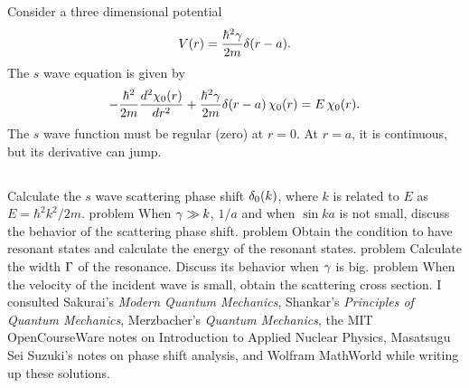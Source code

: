 \documentclass[11pt]{article}
\newcommand{\beq}{\begin{equation*}}
\newcommand{\eeq}{\end{equation*}}
\newenvironment{statement}[1]
{
	\section{#1}
	\color{darkgray}
	\ignorespaces
}
{
}
\newenvironment{problem}
{
	\color{darkgray}
	\subsection{}
	\ignorespaces
}
\newcommand{\Schrodinger}{Schr\"{o}dinger}
\begin{document}
\begin{statement}{}
	Consider a three dimensional potential
	\beq
		V(r) = \frac{\hbar^2 \gam}{2m} \del(r - a).
	\eeq
	The $s$ wave {\Schrodinger} equation is given by
	\beq
		-\frac{\hbar^2}{2m} \dv[2]{\chior}{r} + \frac{\hbar^2 \gam}{2m} \del(r - a) \, \chior = E \,\chior.
	\eeq
	The $s$ wave function must be regular (zero) at $r = 0$.  At $r = a$, it is continuous, but its derivative can jump.
\end{statement}

\begin{problem}
	Calculate the $s$ wave scattering phase shift $\delta_0(k)$, where $k$ is related to $E$ as $E = \hbar^2 k^2 / 2m$.
\end{problem}

\begin{problem}
	When $\gamma \gg k$, $1/a$ and when $\sin ka$ is not small, discuss the behavior of the scattering phase shift.
\end{problem}

\begin{problem}
	Obtain the condition to have resonant states and calculate the energy of the resonant states.
\end{problem}

\begin{problem}
	Calculate the width $\Gamma$ of the resonance.  Discuss its behavior when $\gamma$ is big.
\end{problem}

\begin{problem}
	When the velocity of the incident wave is small, obtain the scattering cross section.
\end{problem}



\vfill
{\footnotesize I consulted Sakurai's \emph{Modern Quantum Mechanics}, Shankar's \emph{Principles of Quantum Mechanics}, Merzbacher's \emph{Quantum Mechanics}, the MIT OpenCourseWare notes on Introduction to Applied Nuclear Physics, Masatsugu Sei Suzuki's notes on phase shift analysis, and Wolfram MathWorld while writing up these solutions.}
\end{document}
